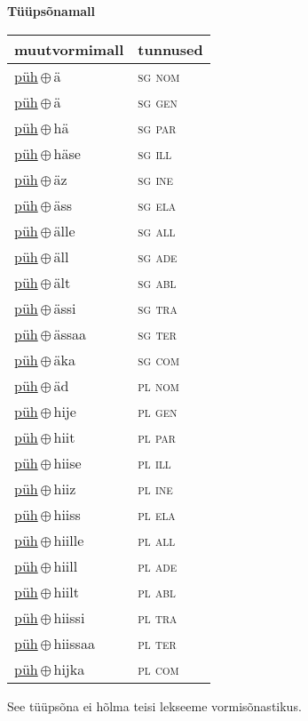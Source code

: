 

\vspace{3.5em}
\noindent \begin{minipage}{\textwidth}
\noindent \textbf{Tüüpsõnamall \,}\\

\begin{sideways}
\begin{tabular}{l l}
muutvormimall & tunnused \\
\hline
\underline{püh}\,$\oplus$\,ä & \textsc{ sg nom } \\
\underline{püh}\,$\oplus$\,ä & \textsc{ sg gen } \\
\underline{püh}\,$\oplus$\,hä & \textsc{ sg par } \\
\underline{püh}\,$\oplus$\,häse & \textsc{ sg ill } \\
\underline{püh}\,$\oplus$\,äz & \textsc{ sg ine } \\
\underline{püh}\,$\oplus$\,äss & \textsc{ sg ela } \\
\underline{püh}\,$\oplus$\,älle & \textsc{ sg all } \\
\underline{püh}\,$\oplus$\,äll & \textsc{ sg ade } \\
\underline{püh}\,$\oplus$\,ält & \textsc{ sg abl } \\
\underline{püh}\,$\oplus$\,ässi & \textsc{ sg tra } \\
\underline{püh}\,$\oplus$\,ässaa & \textsc{ sg ter } \\
\underline{püh}\,$\oplus$\,äka & \textsc{ sg com } \\
\underline{püh}\,$\oplus$\,äd & \textsc{ pl nom } \\
\underline{püh}\,$\oplus$\,hije & \textsc{ pl gen } \\
\underline{püh}\,$\oplus$\,hiit & \textsc{ pl par } \\
\underline{püh}\,$\oplus$\,hiise & \textsc{ pl ill } \\
\underline{püh}\,$\oplus$\,hiiz & \textsc{ pl ine } \\
\underline{püh}\,$\oplus$\,hiiss & \textsc{ pl ela } \\
\underline{püh}\,$\oplus$\,hiille & \textsc{ pl all } \\
\underline{püh}\,$\oplus$\,hiill & \textsc{ pl ade } \\
\underline{püh}\,$\oplus$\,hiilt & \textsc{ pl abl } \\
\underline{püh}\,$\oplus$\,hiissi & \textsc{ pl tra } \\
\underline{püh}\,$\oplus$\,hiissaa & \textsc{ pl ter } \\
\underline{püh}\,$\oplus$\,hijka & \textsc{ pl com } \\
\end{tabular}
\end{sideways}
\label{tab:tüüpsõnamall-pühä}

\end{minipage}

 
\vspace{1em}
\noindent See tüüpsõna ei hõlma teisi lekseeme vormi\-sõnastikus.
